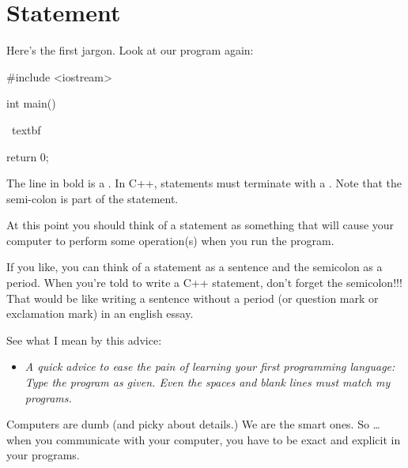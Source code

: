 \newpage\section{Statement}

Here's the first jargon. Look at our program again:
\begin{console}[commandchars=\~\%\@]
#include <iostream>

int main()
{
    ~textbf%

    return 0;
}
\end{console}

The line in bold is a 
. 
In C++, statements must terminate with a 
. 
Note that the semi-colon is part of the statement. 

At this point you should think of a statement as something that will cause 
your computer to perform some operation(s) when you run the program.

If you like, you can think of a statement as a sentence and the semicolon as a
period. When you're told to write a C++ statement, don't forget the 
semicolon!!! 
That would be like writing a sentence without a period (or question mark or 
exclamation mark) in an english essay.

See what I mean by this advice:

\begin{itemize}
\item[]
\textit{A quick advice to ease the pain of learning your first programming 
language: Type the program 
 as given. 
Even the spaces and blank lines must match my programs.}
\end{itemize}

Computers are dumb (and picky about details.) 
We are the smart ones. So … when you communicate with your computer, 
you have to be exact and explicit in your programs.



